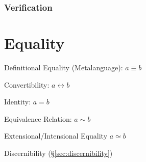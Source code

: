 \subsubsection{Verification}\label{sec:verification}



\section{Equality}\label{sec:equality}\cite{baez15}

Definitional Equality (Metalanguage): $a \equiv b$

Convertibility: $a \leftrightarrow b$

Identity: $a = b$

Equivalence Relation: $a \sim b$

Extensional/Intensional Equality $a \simeq b$

Discernibility (\S\ref{sec:discernibility})


